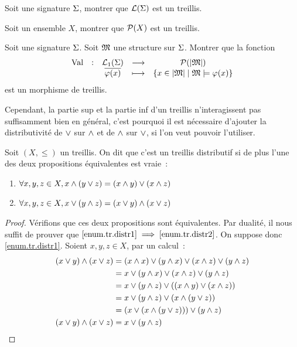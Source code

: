 \begin{exercise}
  Soit une signature $\Sigma$, montrer que $\mathcal{L}(\Sigma)$ est un treillis.
\end{exercise}

\begin{exercise}
  Soit un ensemble $X$, montrer que $\mathcal{P} (X)$ est un treillis.
\end{exercise}

\begin{exercise}
  Soit une signature $\Sigma$. Soit $\mathfrak{M}$ une structure sur $\Sigma$.
  Montrer que la fonction
  \[
  \makeFun{\Val}{\LinTar_1(\Sign)}{\powerset(\carMM)}
          {\clas{\varFF(x)}}{\compr{x \in \carMM}{\varMM\satisf\varFF(x)}}
  \]
  est un morphisme de treillis.
\end{exercise}

Cependant, la partie sup et la partie inf d'un treillis n'interagissent pas
suffisamment bien en général, c'est pourquoi il est nécessaire d'ajouter la
distributivité de $\vee$ sur $\wedge$ et de $\wedge$ sur $\vee$, si l'on veut
pouvoir l'utiliser.

\begin{definition}
  Soit $(X,\leq)$ un treillis. On dit que c'est un treillis distributif si de
  plus l'une des deux propositions équivalentes est vraie~:
  \begin{enumerate}[label=(\roman*)]
  \item \label{enum.tr.distr1}
    $\forall x,y,z\in X, x\wedge (y\vee z) = (x\wedge y)\vee (x\wedge z)$
  \item \label{enum.tr.distr2}
    $\forall x,y,z\in X, x\vee (y\wedge z) = (x\vee y)\wedge (x\vee z)$
  \end{enumerate}
\end{definition}

\begin{proof}
  Vérifions que ces deux propositions sont équivalentes. Par dualité, il nous
  suffit de prouver que $\ref{enum.tr.distr1} \implies\ref{enum.tr.distr2}$.
  On suppose donc \ref{enum.tr.distr1}. Soient $x,y,z\in X$, par un calcul~:
  \begin{align*}
    (x\vee y) \wedge (x \vee z) &= (x \wedge x) \vee (y \wedge x)
    \vee (x \wedge z) \vee (y \wedge z)\\
    &= x\vee (y\wedge x) \vee (x \wedge z) \vee (y \wedge z)\\
    &= x\vee (y\wedge z) \vee ((x\wedge y)\vee (x\wedge z))\\
    &= x\vee (y\wedge z) \vee (x\wedge (y \vee z))\\
    &= (x\vee (x\wedge (y \vee z)))\vee (y \wedge z)\\
    (x\vee y)\wedge (x\vee z)&= x\vee (y \wedge z)\qedhere
  \end{align*}
\end{proof}

